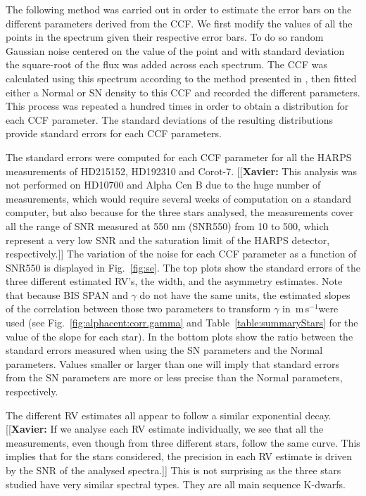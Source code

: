 \documentclass{aa}
\def\ms{\hbox{\,m\,s$^{-1}$}}         %
\newcommand{\xavier}[1]{{\color{blue}[[\textbf{Xavier: }#1]]}}
\begin{document}
The following method was carried out in order to estimate the error bars on the different parameters derived from the CCF. 
We first modify the values of all the points in the spectrum given their respective error bars. 
To do so random Gaussian noise centered on the value of the point and with standard deviation the square-root of the flux was added across each spectrum. 
The CCF was calculated using this spectrum according to the method presented in \citet{Pepe-2002a}, then fitted either a Normal or SN density to this CCF and recorded the different parameters. 
This process was repeated a hundred times in order to obtain a distribution for each CCF parameter. 
The standard deviations of the resulting distributions provide standard errors for each CCF parameters.

The standard errors were computed for each CCF parameter for all the HARPS measurements of HD215152, HD192310 and Corot-7. \xavier{This analysis was not performed on HD10700 and Alpha Cen B due to the huge number of measurements, which would require several weeks of computation on a standard computer, but also because for the three stars analysed, the measurements cover all the range of SNR measured at 550 nm (SNR550) from 10 to 500, which represent a very low SNR and the saturation limit of the HARPS detector, respectively.}
The variation of the noise for each CCF parameter as a function of SNR550 is displayed in Fig.~\ref{fig:se}.
The top plots show the standard errors of the three different estimated RV's, the width, and the asymmetry estimates. 
Note that because BIS SPAN and $\gamma$ do not have the same units, the estimated slopes of the correlation between those two parameters to transform $\gamma$ in \ms were used (see Fig.~\ref{fig:alphacent:corr.gamma} and Table~\ref{table:summaryStars} for the value of the slope for each star). 
In the bottom plots show the ratio between the standard errors measured when using the SN parameters and the Normal parameters. Values smaller or larger than one will imply that standard errors from the SN parameters are more or less precise than the Normal parameters, respectively.

The different RV estimates all appear to follow a similar exponential decay. \xavier{If we analyse each RV estimate individually, we see that all the measurements, even though from three different stars, follow the same curve. This implies that for the stars considered, the precision in each RV estimate is driven by the SNR of the analysed spectra.} This is not surprising as the three stars studied have very similar spectral types. They are all main sequence K-dwarfs. 
\end{document}
